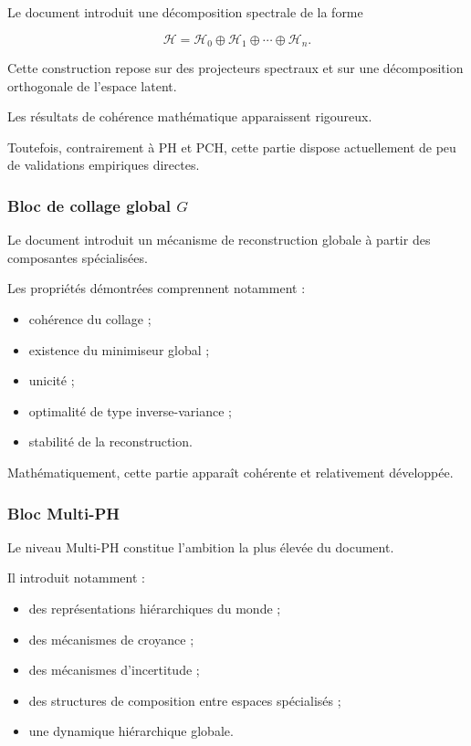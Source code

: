 Le document introduit une décomposition spectrale de la forme

\[
\mathcal H
=
\mathcal H_0
\oplus
\mathcal H_1
\oplus
\cdots
\oplus
\mathcal H_n.
\]

Cette construction repose sur des projecteurs spectraux et sur une décomposition orthogonale de l'espace latent.

Les résultats de cohérence mathématique apparaissent rigoureux.

Toutefois, contrairement à PH et PCH, cette partie dispose actuellement de peu de validations empiriques directes.

\subsubsection{Bloc de collage global \(G\)}

Le document introduit un mécanisme de reconstruction globale à partir des composantes spécialisées.

Les propriétés démontrées comprennent notamment :

\begin{itemize}
    \item cohérence du collage ;
    \item existence du minimiseur global ;
    \item unicité ;
    \item optimalité de type inverse-variance ;
    \item stabilité de la reconstruction.
\end{itemize}

Mathématiquement, cette partie apparaît cohérente et relativement développée.

\subsubsection{Bloc Multi-PH}

Le niveau Multi-PH constitue l'ambition la plus élevée du document.

Il introduit notamment :

\begin{itemize}
    \item des représentations hiérarchiques du monde ;
    \item des mécanismes de croyance ;
    \item des mécanismes d'incertitude ;
    \item des structures de composition entre espaces spécialisés ;
    \item une dynamique hiérarchique globale.
\end{itemize}

